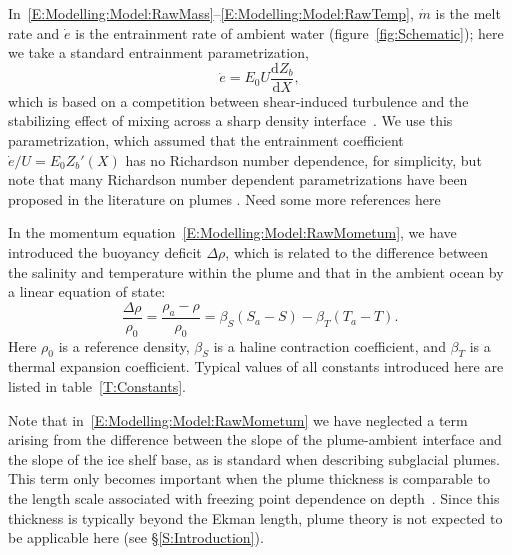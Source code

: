 \documentclass[openacc]{rsproca_new}%
\newcommand{\dd}[2]{\frac{\mathrm{d} #1}{\mathrm{d} #2}}
\newcommand{\red}[1]{{\color{red} #1}}
\begin{document}
In~\eqref{E:Modelling:Model:RawMass}--\eqref{E:Modelling:Model:RawTemp}, $\dot{m}$ is the melt rate and $\dot{e}$ is the entrainment rate of ambient water (figure~\ref{fig:Schematic}); here we take a standard entrainment parametrization, 
\begin{equation}\label{E:Modelling:Model:Entrainment}
\dot{e} = E_0 U \dd{Z_b}{X},
\end{equation}
which is based on a competition between shear-induced turbulence and the stabilizing effect of mixing across a sharp density interface~\citep{Pedersen1980,Turner1986JFM}. We use this parametrization, which assumed that the entrainment coefficient $\dot{e}/U = E_0 Z_b'(X)$ has no Richardson number dependence, for simplicity, but note that many Richardson number dependent parametrizations have been proposed in the literature on plumes \cite[see][for example]{Holland2007JGeophysResOceans}. \red{Need some more references here}


In the momentum equation~\eqref{E:Modelling:Model:RawMometum}, we have introduced the buoyancy deficit $\Delta \rho$, which is related to the difference between the salinity and temperature within the plume and that in the ambient ocean by a linear equation of state:
\begin{equation}\label{E:Modelling:Model:EquationOfState}
\frac{\Delta \rho}{\rho_0}  = \frac{\rho_a - \rho}{\rho_0}= \beta_S(S_a - S) - \beta_T (T_a - T).
\end{equation}
Here $\rho_0$ is a reference density, $\beta_S$ is a haline contraction coefficient, and $\beta_T$ is a thermal expansion coefficient. Typical values of all constants introduced here are listed in table~\ref{T:Constants}.

Note that in~\eqref{E:Modelling:Model:RawMometum} we have neglected a term arising from the difference between the slope of the plume-ambient interface and the slope of the ice shelf base, as is standard when describing subglacial plumes. This term only becomes important when the plume thickness is comparable to the length scale associated with freezing point dependence on depth~\citep{Jenkins2011JPhysOcean}. Since this thickness is typically beyond the Ekman length, plume theory is not expected to be applicable here (see \S\ref{S:Introduction}).
\end{document}
